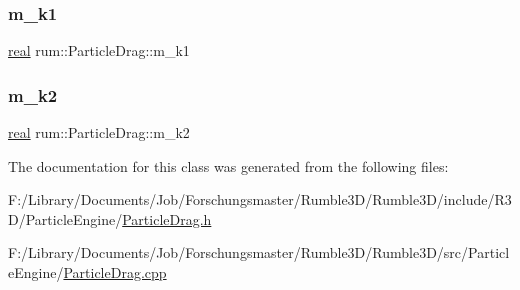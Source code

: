 \subsubsection{\texorpdfstring{m\+\_\+k1}{m\_k1}}
{\footnotesize\ttfamily \hyperlink{namespacerum_a7e8cca23573d5eaead0f138cbaa4862c}{real} rum\+::\+Particle\+Drag\+::m\+\_\+k1\hspace{0.3cm}{\ttfamily [protected]}}

\mbox{\label{classrum_1_1_particle_drag_a30f863703e55b68316c64c6f9a8cc25f}} 
\subsubsection{\texorpdfstring{m\+\_\+k2}{m\_k2}}
{\footnotesize\ttfamily \hyperlink{namespacerum_a7e8cca23573d5eaead0f138cbaa4862c}{real} rum\+::\+Particle\+Drag\+::m\+\_\+k2\hspace{0.3cm}{\ttfamily [protected]}}



The documentation for this class was generated from the following files\+:\begin{DoxyCompactItemize}
\item 
F\+:/\+Library/\+Documents/\+Job/\+Forschungsmaster/\+Rumble3\+D/\+Rumble3\+D/include/\+R3\+D/\+Particle\+Engine/\hyperlink{_particle_drag_8h}{Particle\+Drag.\+h}\item 
F\+:/\+Library/\+Documents/\+Job/\+Forschungsmaster/\+Rumble3\+D/\+Rumble3\+D/src/\+Particle\+Engine/\hyperlink{_particle_drag_8cpp}{Particle\+Drag.\+cpp}\end{DoxyCompactItemize}
